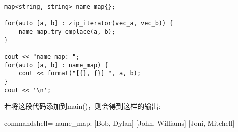 \begin{lstlisting}[style=styleCXX]
map<string, string> name_map{};

for(auto [a, b] : zip_iterator(vec_a, vec_b)) {
	name_map.try_emplace(a, b);
}

cout << "name_map: ";
for(auto [a, b] : name_map) {
	cout << format("[{}, {}] ", a, b);
}
cout << '\n';
\end{lstlisting}

若将这段代码添加到main()，则会得到这样的输出:

\begin{tcblisting}{commandshell={}}
name_map: [Bob, Dylan] [John, Williams] [Joni, Mitchell]
\end{tcblisting}












